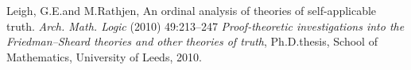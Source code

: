 \documentclass[UKenglish,cleveref,DIV=12]{scrartcl}
\theoremstyle{definition}
\theoremstyle{definition}
\begin{document}

\begin{thebibliography}{10}
	 Leigh, G.E.\@ and M.\@ Rathjen, An ordinal analysis of theories of self-applicable truth. \emph{Arch. Math. Logic} (2010) 49:213–247
	 \emph{Proof-theoretic investigations into the Friedman--Sheard theories and other theories of truth}, Ph.D.\@ thesis, School of Mathematics, University of Leeds, 2010.
\end{thebibliography}

\end{document}
